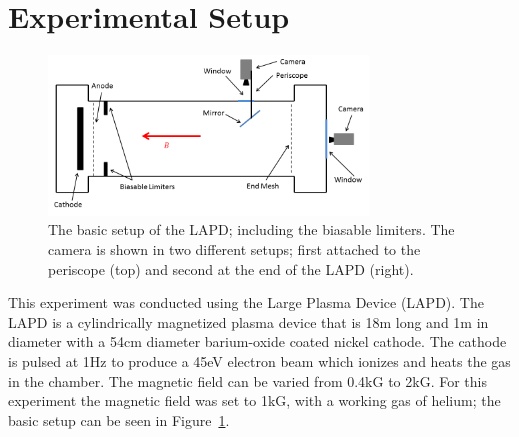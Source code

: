 \documentclass[%
 reprint,
 amsmath,amssymb,
 aps,
]{revtex4-1}
\begin{document}
%
%
%
%
\section{\label{sec:level1}Experimental Setup}

\begin{figure}[!htbp] %
\centerline{}
\includegraphics[width=8.5cm]{plot_of_LAPD}
\caption{\label{fig:plot_of_LAPD}The basic setup of the LAPD; including the biasable limiters. The camera is shown in two different setups; first attached to the periscope (top) and second at the end of the LAPD (right).}
\end{figure}

This experiment was conducted using the Large Plasma Device (LAPD). The LAPD is a cylindrically magnetized plasma device that is 18m long and 1m in diameter with a 54cm diameter barium-oxide coated nickel cathode. The cathode is pulsed at 1Hz to produce a 45eV electron beam which ionizes and heats the gas in the chamber. The magnetic field can be varied from 0.4kG to 2kG. For this experiment the magnetic field was set to 1kG, with a working gas of helium; the basic setup can be seen in Figure~\ref{fig:plot_of_LAPD}.
\end{document}
